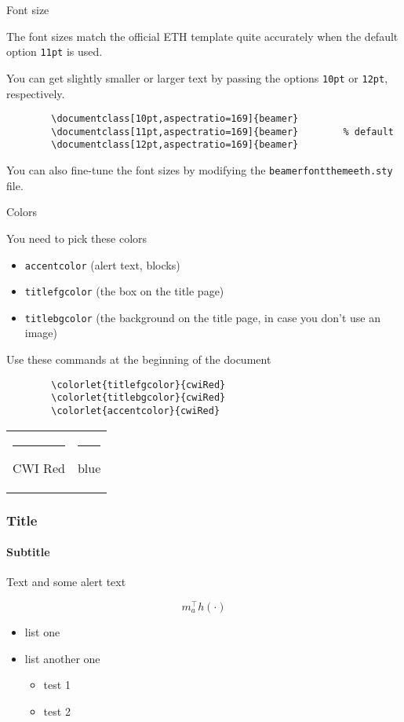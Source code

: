 \documentclass[11pt,aspectratio=169]{beamer}
\begin{document}
\begin{frame}[fragile]{Font size}

	The font sizes match the official ETH template quite accurately when the default option \verb+11pt+ is used.
	
	\bigskip
	
	You can get slightly smaller or larger text by passing the options \verb+10pt+ or \verb+12pt+, respectively.
	\begin{verbatim}
		\documentclass[10pt,aspectratio=169]{beamer}
		\documentclass[11pt,aspectratio=169]{beamer}		% default
		\documentclass[12pt,aspectratio=169]{beamer}
	\end{verbatim}	
	
	\bigskip
	You can also fine-tune the font sizes by modifying the \verb+beamerfontthemeeth.sty+ file.

\end{frame}

\begin{frame}[fragile]{Colors}

	You need to pick these colors
	\begin{itemize}
		\item \texttt{accentcolor} (alert text, blocks)
		\item \texttt{titlefgcolor} (the box on the title page)
		\item \texttt{titlebgcolor} (the background on the title page, in case you don't use an image)
	\end{itemize}
	Use these commands at the beginning of the document
	\begin{verbatim}
		\colorlet{titlefgcolor}{cwiRed}
		\colorlet{titlebgcolor}{cwiRed}
		\colorlet{accentcolor}{cwiRed}
	\end{verbatim}

	\medskip

	\begin{tabular}{ll}
	\textcolor{cwiRed}{\rule{4mm}{3mm}} CWI Red &
	\textcolor{blue}{\rule{4mm}{3mm}} blue
	\end{tabular}
	
\end{frame}

\begin{frame}

	\frametitle{Title}
	\framesubtitle{Subtitle}
	
	Text and some \alert{alert text}
	
	\[
	m_a^\top h(\cdot)
	\]
	
	
	\begin{itemize}
	\item list one
	\item list another one
		\begin{itemize}
		\item test 1
		\item test 2
		\end{itemize}
	\end{itemize}

\end{frame}
\end{document}
